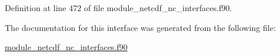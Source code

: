 Definition at line 472 of file module\+\_\+netcdf\+\_\+nc\+\_\+interfaces.\+f90.



The documentation for this interface was generated from the following file\+:\begin{DoxyCompactItemize}
\item 
\hyperlink{module__netcdf__nc__interfaces_8f90}{module\+\_\+netcdf\+\_\+nc\+\_\+interfaces.\+f90}\end{DoxyCompactItemize}
